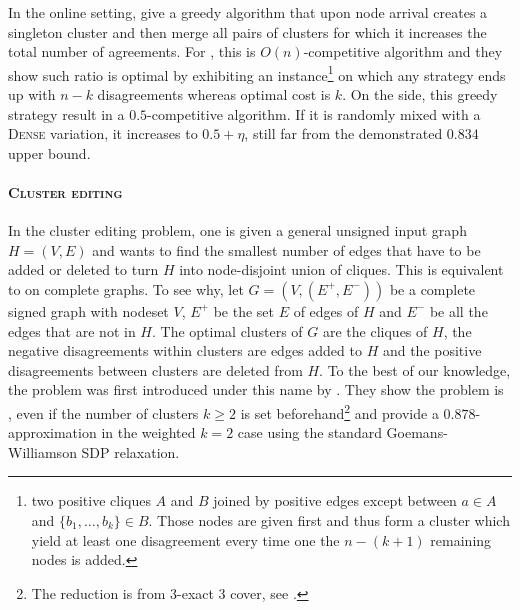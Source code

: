 In the online setting, \textcite{greedyOnline10} give a greedy algorithm that upon node arrival creates a
singleton cluster and then merge all pairs of clusters for which it increases the total number of
agreements. For \mind{}, this is $O(n)$-competitive algorithm and they show such ratio is optimal by
exhibiting an instance\footnote{two positive cliques $A$ and $B$ joined by positive edges except
between $a\in A$ and $\{b_1,\ldots, b_k\}\in B$. Those nodes are given first and thus form a cluster
which yield at least one disagreement every time one the $n-(k+1)$ remaining nodes is added.} on
which any strategy ends up with $n - k$ disagreements whereas optimal cost is $k$. On the \maxa{}
side, this greedy strategy result in a $0.5$-competitive algorithm. If it is randomly mixed with a
\textsc{Dense} variation, it increases to $0.5+\eta$, still far from the demonstrated $0.834$ upper
bound.

\paragraph{\textsc{Cluster editing}}


In the cluster editing problem, one is given a general unsigned input graph $H=(V,E)$ and wants to
find the smallest number of edges that have to be added or deleted to turn $H$ into node-disjoint
union of cliques. This is equivalent to \pcc{} on complete graphs. To see why, let $G=(V,(E^+,E^-))$
be a complete signed graph with nodeset $V$, $E^+$ be the set $E$ of edges of $H$ and $E^-$ be all
the edges that are not in $H$. The optimal clusters of $G$ are the cliques of $H$, the negative
disagreements within clusters are edges added to $H$ and the positive disagreements between clusters
are deleted from $H$.  To the best of our knowledge, the problem was first introduced under this
name by \textcite{Shamir02}. They show the problem is
\NPc{}, even if the number of clusters $k\geq2$ is set beforehand\footnote{The reduction is from
3-exact 3 cover, see \autocite[Theorems 1, 2 and Corollary 1]{Shamir02}.} and provide a
$0.878$-approximation in the weighted $k=2$ case using the standard Goemans-Williamson SDP
relaxation. 

